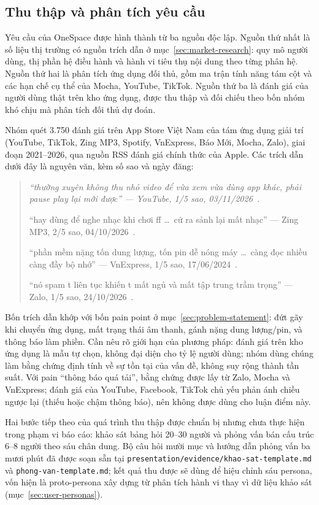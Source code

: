 \subsection{Thu thập và phân tích yêu cầu}
\label{sec:requirement-gathering}

Yêu cầu của OneSpace được hình thành từ ba nguồn độc lập. Nguồn thứ nhất là số liệu thị trường có nguồn trích dẫn ở mục~\ref{sec:market-research}: quy mô người dùng, thị phần hệ điều hành và hành vi tiêu thụ nội dung theo từng phân hệ. Nguồn thứ hai là phân tích ứng dụng đối thủ, gồm ma trận tính năng tám cột và các hạn chế cụ thể của Mocha, YouTube, TikTok. Nguồn thứ ba là đánh giá của người dùng thật trên kho ứng dụng, được thu thập và đối chiếu theo bốn nhóm khó chịu mà phân tích đối thủ dự đoán.

Nhóm quét 3.750 đánh giá trên App Store Việt Nam của tám ứng dụng giải trí (YouTube, TikTok, Zing MP3, Spotify, VnExpress, Báo Mới, Mocha, Zalo), giai đoạn 2021--2026, qua nguồn RSS đánh giá chính thức của Apple. Các trích dẫn dưới đây là nguyên văn, kèm số sao và ngày đăng:

\begin{quote}
\itshape
``thường xuyên không thu nhỏ video để vừa xem vừa dùng app khác, phải pause play lại mới được'' --- YouTube, 1/5 sao, 03/11/2026~\cite{review-youtube-2026}.

``hay dùng để nghe nhạc khi chơi ff \ldots\ cứ ra sảnh lại mất nhạc'' --- Zing MP3, 2/5 sao, 04/10/2026~\cite{review-zing-2026}.

``phần mềm nặng tốn dung lượng, tốn pin dễ nóng máy \ldots\ càng đọc nhiều càng đầy bộ nhớ'' --- VnExpress, 1/5 sao, 17/06/2024~\cite{review-vnexpress}.

``nó spam t liên tục khiến t mất ngủ và mất tập trung trầm trọng'' --- Zalo, 1/5 sao, 24/10/2026~\cite{review-zalo-2026}.
\end{quote}

Bốn trích dẫn khớp với bốn pain point ở mục~\ref{sec:problem-statement}: đứt gãy khi chuyển ứng dụng, mất trạng thái âm thanh, gánh nặng dung lượng/pin, và thông báo làm phiền. Cần nêu rõ giới hạn của phương pháp: đánh giá trên kho ứng dụng là mẫu tự chọn, không đại diện cho tỷ lệ người dùng; nhóm dùng chúng làm bằng chứng định tính về sự tồn tại của vấn đề, không suy rộng thành tần suất. Với pain ``thông báo quá tải'', bằng chứng được lấy từ Zalo, Mocha và VnExpress; đánh giá của YouTube, Facebook, TikTok chủ yếu phản ánh chiều ngược lại (thiếu hoặc chậm thông báo), nên không được dùng cho luận điểm này.

Hai bước tiếp theo của quá trình thu thập được chuẩn bị nhưng chưa thực hiện trong phạm vi báo cáo: khảo sát bảng hỏi 20--30 người và phỏng vấn bán cấu trúc 6--8 người theo sáu chân dung. Bộ câu hỏi mười mục và hướng dẫn phỏng vấn ba mươi phút đã được soạn sẵn tại \texttt{presentation/evidence/khao-sat-template.md} và \texttt{phong-van-template.md}; kết quả thu được sẽ dùng để hiệu chỉnh sáu persona, vốn hiện là proto-persona xây dựng từ phân tích hành vi thay vì dữ liệu khảo sát (mục~\ref{sec:user-personas}).
